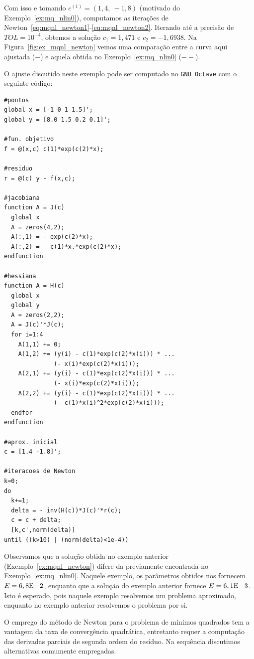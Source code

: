 \begin{ex}
Com isso e tomando $c^{(1)} = (1,4, ~-1,8)$ (motivado do Exemplo~\ref{ex:mq_nlin0}), computamos as iterações de Newton~\eqref{eq:mqnl_newton1}-\eqref{eq:mqnl_newton2}. Iterando até a precisão de $TOL = 10^{-4}$, obtemos a solução $c_1 = 1,471$ e $c_2 = -1,6938$. Na Figura~\ref{fig:ex_mqnl_newton} vemos uma comparação entre a curva aqui ajustada ($-$) e aquela obtida no Exemplo~\ref{ex:mq_nlin0} ($--$).

\ifisoctave
O ajuste discutido neste exemplo pode ser computado no \verb+GNU Octave+ com o seguinte código:
\begin{verbatim}
#pontos
global x = [-1 0 1 1.5]';
global y = [8.0 1.5 0.2 0.1]';

#fun. objetivo
f = @(x,c) c(1)*exp(c(2)*x);

#residuo
r = @(c) y - f(x,c);

#jacobiana
function A = J(c)
  global x
  A = zeros(4,2);
  A(:,1) = - exp(c(2)*x);
  A(:,2) = - c(1)*x.*exp(c(2)*x);
endfunction

#hessiana
function A = H(c)
  global x
  global y
  A = zeros(2,2);
  A = J(c)'*J(c);
  for i=1:4
    A(1,1) += 0;
    A(1,2) += (y(i) - c(1)*exp(c(2)*x(i))) * ...
              (- x(i)*exp(c(2)*x(i)));
    A(2,1) += (y(i) - c(1)*exp(c(2)*x(i))) * ...
              (- x(i)*exp(c(2)*x(i)));
    A(2,2) += (y(i) - c(1)*exp(c(2)*x(i))) * ...
              (- c(1)*x(i)^2*exp(c(2)*x(i)));
  endfor
endfunction

#aprox. inicial
c = [1.4 -1.8]';

#iteracoes de Newton
k=0;
do
  k+=1;
  delta = - inv(H(c))*J(c)'*r(c);
  c = c + delta;
  [k,c',norm(delta)]
until ((k>10) | (norm(delta)<1e-4))
\end{verbatim}
\fi
\end{ex}

Observamos que a solução obtida no exemplo anterior (Exemplo~\ref{ex:mqnl_newton}) difere da previamente encontrada no Exemplo~\ref{ex:mq_nlin0}. Naquele exemplo, os parâmetros obtidos nos fornecem $E = 6,8\mathrm{E}\!-\!2$, enquanto que a solução do exemplo anterior fornece $E = 6,1\mathrm{E}\!-\!3$. Isto é esperado, pois naquele exemplo resolvemos um problema aproximado, enquanto no exemplo anterior resolvemos o problema por si.

O emprego do método de Newton para o problema de mínimos quadrados tem a vantagem da taxa de convergência quadrática, entretanto requer a computação das derivadas parciais de segunda ordem do resíduo. Na sequência discutimos alternativas comumente empregadas.

